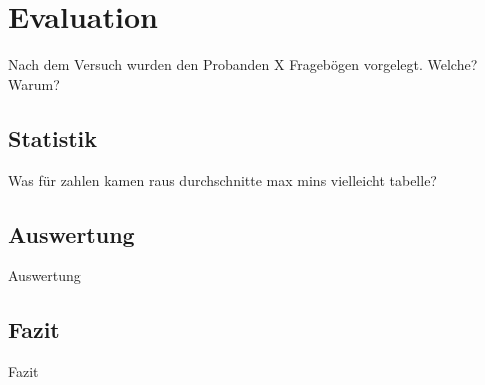 \chapter{Evaluation}
Nach dem Versuch wurden den Probanden X Fragebögen vorgelegt.
Welche? Warum?

\section{Statistik}
Was für zahlen kamen raus
durchschnitte max mins
vielleicht tabelle?

\section{Auswertung}
Auswertung

\section{Fazit}
Fazit